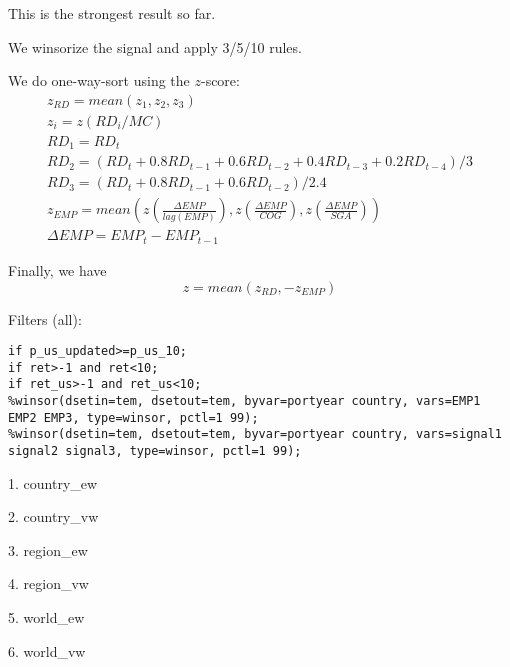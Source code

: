 

\usepackage[T1]{fontenc}




\thispagestyle{fancy}

\newcommand{\code}{\texttt}
\newcommand*{\Commonpath}{20190104/comboMC}

This is the strongest result so far.

We winsorize the signal and apply 3/5/10 rules.

We do one-way-sort using the $z$-score:
$$
\begin{aligned}
& z_{RD} = mean(z_1, z_2, z_3) \\
& z_i = z(RD_i/MC) \\
& RD_1 = RD_t \\
& RD_2 = (RD_t + 0.8RD_{t-1} + 0.6RD_{t-2} + 0.4RD_{t-3} + 0.2RD_{t-4})/3 \\
& RD_3 = (RD_t + 0.8RD_{t-1} + 0.6RD_{t-2})/2.4 
& \\
& z_{EMP} = mean(z(\frac{\Delta EMP}{lag(EMP)}), z(\frac{\Delta EMP}{COG}), z(\frac{\Delta EMP}{SGA})) \\
& \Delta EMP = EMP_t - EMP_{t-1}
\end{aligned}
$$

Finally, we have
$$
z = mean(z_{RD}, -z_{EMP})
$$


Filters (all):

\code{if p\_us\_updated>=p\_us\_10;} \\
\code{if ret>-1 and ret<10;} \\
\code{if ret\_us>-1 and ret\_us<10;} \\
\code{\%winsor(dsetin=tem, dsetout=tem, byvar=portyear country, vars=EMP1 EMP2 EMP3, type=winsor, pctl=1 99);} \\
\code{\%winsor(dsetin=tem, dsetout=tem, byvar=portyear country, vars=signal1 signal2 signal3, type=winsor, pctl=1 99);} \\

\small

1. country\_ew


2. country\_vw


3. region\_ew


4. region\_vw


5. world\_ew


6. world\_vw




